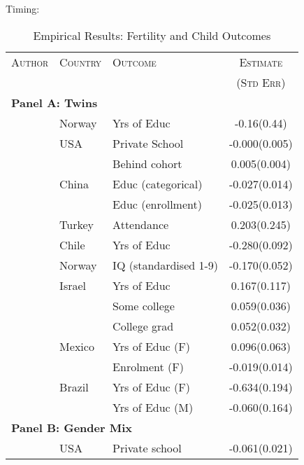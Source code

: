 Timing: \citet{Miller2009}

\begin{table}
\caption{Empirical Results: Fertility and Child Outcomes}
\label{Ftab:childQQ}
\begin{tabular}{lllc} \toprule
\textsc{Author} & \textsc{Country} & \textsc{Outcome} & \textsc{Estimate} \\
                &                  &                  & \textsc{(Std Err)} \\ \midrule
\multicolumn{4}{l}{\textbf{Panel A: Twins}} \\
\citet{Blacketal2005}            &Norway   & Yrs of Educ         &-0.16(0.44) \\
\citet{Caceres2006}              &USA      &Private School       & -0.000(0.005)\\
                                 &        &Behind cohort        & 0.005(0.004)\\
\citet{Lietal2008}               &China    &Educ (categorical)   & -0.027(0.014)\\
                                 &         &Educ (enrollment)    & -0.025(0.013)\\
\citet{Dayiogluetal2009}         &Turkey   &Attendance           & 0.203(0.245)\\
\citet{Sanhueza2009}             &Chile    &Yrs of Educ          &-0.280(0.092)\\
\citet{Blacketal2010}            &Norway   &IQ (standardised 1-9)& -0.170(0.052)\\
\citet{Angristetal2010}          &Israel   &Yrs of Educ          & 0.167(0.117)\\
                                 &         &Some college         & 0.059(0.036)\\
                                 &         &College grad         & 0.052(0.032)\\
\citet{FitzsimonsMalde2010}      &Mexico   &Yrs of Educ (F)      & 0.096(0.063)\\
                                 &         &Enrolment (F)        &-0.019(0.014)\\
\citet{SouzaPonczek2012}         &Brazil   &Yrs of Educ (F)      & -0.634(0.194)\\
                                 &         &Yrs of Educ (M)      & -0.060(0.164)\\ \midrule
\multicolumn{4}{l}{\textbf{Panel B: Gender Mix}} \\
\citet{ConleyGlauber2006}        &USA      &Private school       &-0.061(0.021) \\

\end{tabular}
\end{table}
